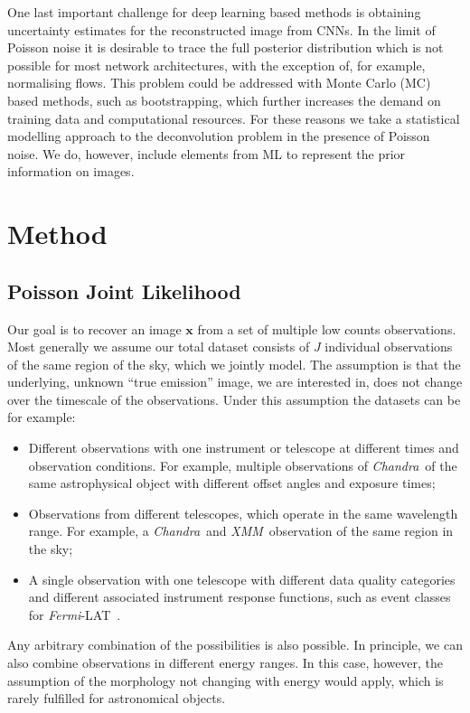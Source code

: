 \documentclass[twocolumn]{aastex631}
\newcommand{\chandra}{\textit{Chandra}~}
\newcommand{\xmm}{\textit{XMM}~}
\newcommand{\fermi}{\textit{Fermi}-LAT~}
\begin{document}
    One last important challenge for deep learning based methods is obtaining uncertainty estimates for the reconstructed image from CNNs. In the limit of Poisson noise it is desirable to trace the full posterior distribution
    which is not possible for most network architectures, with the exception of, for example, normalising flows. This problem could be addressed with Monte Carlo (MC) based methods, such as bootstrapping, which further increases the demand on training data and computational resources. For these reasons we take a statistical modelling approach to the deconvolution problem in the presence of Poisson noise. We do, however, include elements from ML to represent the prior information on images.

    \section{Method}
    
    \subsection{Poisson Joint Likelihood}
    Our goal is to recover an image $\mathbf{x}$ from a set of multiple low counts observations. Most generally we assume our total dataset consists of $J$ individual observations of the same region of the sky, which we jointly model. The assumption is that the underlying, unknown \enquote{true emission} image, we are interested in, does not change over the timescale of the observations. Under this assumption the datasets can be for example:

    \begin{itemize}
        \item Different observations with one instrument or telescope at different times and observation conditions. For example, multiple observations of \chandra of the same astrophysical object with different offset angles and exposure times;
        \item Observations from different telescopes, which operate in the same wavelength range. For example, a \chandra and \xmm observation of the same region in the sky;
        \item A single observation with one telescope with different data quality categories and different associated instrument response functions, such as event classes for \fermi.
    \end{itemize}

    Any arbitrary combination of the possibilities is also possible.
    In principle, we can also combine observations in different energy ranges. In this case, however, the assumption of the morphology not changing with energy would apply, which is rarely fulfilled for astronomical objects.
    
\end{document}

